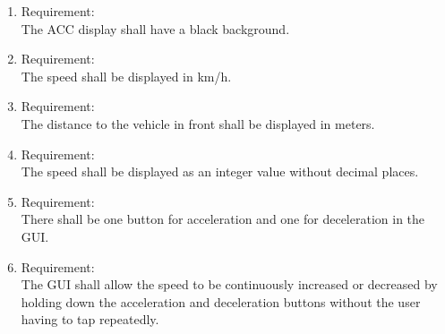 \begin{enumerate}[label*=\arabic*.]
 	\item \label{req.1}  Requirement: \\
	 	The ACC display shall have a black background.  \\

        \item \label{req.2} Requirement: \\
        The speed shall be displayed in km/h.  \\
	 	\item \label{req.3} Requirement: \\
        The distance to the vehicle in front shall be displayed in meters. \\
        \item \label{req.4} Requirement: \\
        The speed shall be displayed as an integer value without decimal places. \\
        \item \label{req.5} Requirement: \\
        There shall be one button for acceleration and one for deceleration in the GUI. \\
        \item \label{req.6} Requirement: \\
        The GUI shall allow the speed to be continuously increased or decreased by holding down the acceleration and deceleration buttons without the user having to tap repeatedly. \\

        
	 \end{enumerate}

